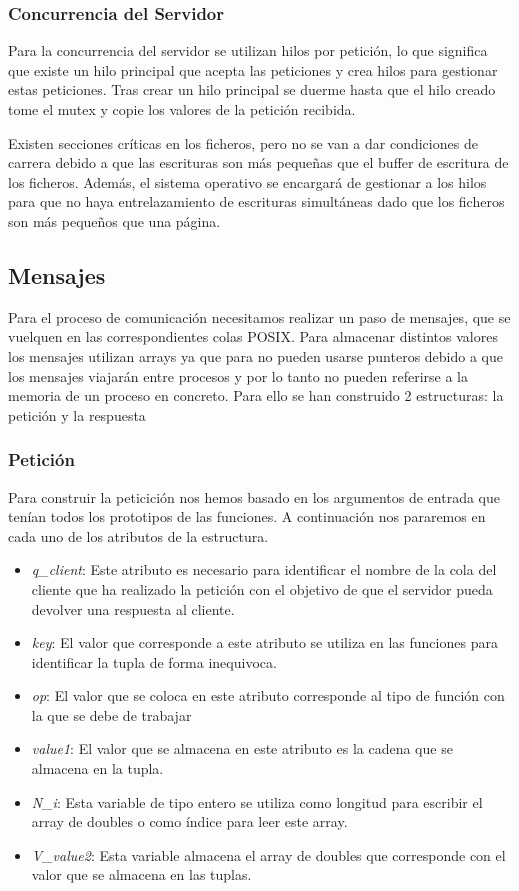 \documentclass[]{article}
\begin{document}
\subsubsection{Concurrencia del Servidor}
\label{subsec::concurrencia_servidor}
Para la concurrencia del servidor se utilizan hilos por petición, lo que significa que existe un hilo principal que acepta las peticiones y crea hilos para gestionar estas peticiones.
Tras crear un hilo principal se duerme hasta que el hilo creado tome el mutex y copie los valores de la petición recibida.

Existen secciones críticas en los ficheros, pero no se van a dar condiciones de carrera debido a que las escrituras son más pequeñas que el buffer de escritura de los ficheros. Además, el sistema operativo se encargará de gestionar a los hilos para que no haya entrelazamiento de escrituras simultáneas dado que los ficheros son más pequeños que una página.
\subsection{Mensajes}
\label{subsec:mensajes}
Para el proceso de comunicación necesitamos realizar un paso de mensajes, que se vuelquen en las correspondientes colas POSIX. Para almacenar distintos valores los mensajes utilizan arrays ya que para no pueden usarse punteros debido a que los mensajes viajarán entre procesos y por lo tanto no pueden referirse a la memoria de un proceso en concreto.
Para ello se han construido 2 estructuras: la petición y la respuesta

\subsubsection{Petición}
\label{subsec::peticion}
Para construir la peticición nos hemos basado en los argumentos de entrada que tenían todos los prototipos de las funciones. A continuación nos pararemos en cada uno de los atributos de la estructura.

\begin{itemize}
  \item \textit{q\_client}: Este atributo es necesario para identificar el nombre de la cola del cliente que ha realizado la petición con el objetivo de que el servidor pueda devolver una respuesta al cliente.
  \item \textit{key}: El valor que corresponde a este atributo se utiliza en las funciones para identificar la tupla de forma inequivoca.
  \item \textit{op}: El valor que se coloca en este atributo corresponde al tipo de función con la que se debe de trabajar
  \item \textit{value1}: El valor que se almacena en este atributo es la cadena que se almacena en la tupla.
  \item \textit{N\_i}: Esta variable de tipo entero se utiliza como longitud para escribir el array de doubles o como índice para leer este array.
 \item \textit{V\_value2}: Esta variable almacena el array de doubles que corresponde con el valor que se almacena en las tuplas.
\end{itemize}
\end{document}
